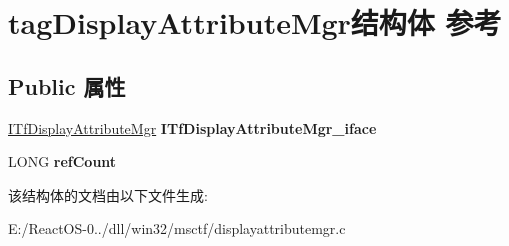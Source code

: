 \hypertarget{structtag_display_attribute_mgr}{}\section{tag\+Display\+Attribute\+Mgr结构体 参考}
\label{structtag_display_attribute_mgr}
\subsection*{Public 属性}
\begin{DoxyCompactItemize}
\item 
\mbox{\label{structtag_display_attribute_mgr_abb90694cc18ac2cc30bdde2e2140ac3e}} 
\hyperlink{interface_i_tf_display_attribute_mgr}{I\+Tf\+Display\+Attribute\+Mgr} {\bfseries I\+Tf\+Display\+Attribute\+Mgr\+\_\+iface}
\item 
\mbox{\label{structtag_display_attribute_mgr_a317a90c041d17aeed2021e1f6aecce60}} 
L\+O\+NG {\bfseries ref\+Count}
\end{DoxyCompactItemize}


该结构体的文档由以下文件生成\+:\begin{DoxyCompactItemize}
\item 
E\+:/\+React\+O\+S-\/0../dll/win32/msctf/displayattributemgr.\+c\end{DoxyCompactItemize}
